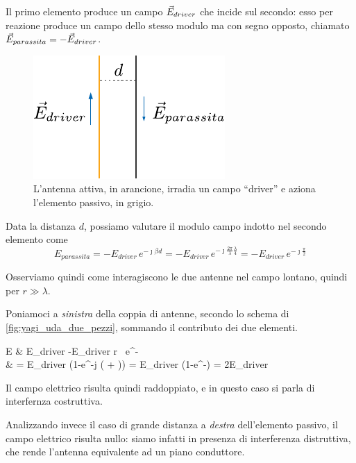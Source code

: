 Il primo elemento produce un campo $\vec{E}_{driver}$ che incide sul secondo: esso per reazione produce un campo dello stesso modulo ma con segno opposto, chiamato $\vec{E}_{parassita} = -\vec{E}_{driver}$.

\begin{figure}[htp]
	\centering
	\includegraphics[]{img/yagi_uda_due_pezzi.pdf}
	\caption{L'antenna attiva, in arancione, irradia un campo ``driver'' e aziona l'elemento passivo, in grigio.}
	\label{fig:yagi_uda_due_pezzi}
\end{figure}

Data la distanza $d$, possiamo valutare il modulo campo indotto nel secondo elemento come
\begin{equation}
	E_{parassita}
	= -E_{driver} \,e^{-\jmath \beta d}
	= -E_{driver} \,e^{-\jmath \frac{2 \pi}{\lambda} \frac{\lambda}{4}}
	= -E_{driver} \, e^{-\jmath \frac{\pi}{2}}
\end{equation}

Osserviamo quindi come interagiscono le due antenne nel campo lontano, quindi per $r \gg \lambda$.

Poniamoci a \emph{sinistra} della coppia di antenne, secondo lo schema di \autoref{fig:yagi_uda_due_pezzi}, sommando il contributo dei due elementi.
\begin{esp}
	E
	& \propto E_{driver}
	-E_{driver}
	 {r}
	\, e^{-\jmath{}} \\
	& = E_{driver}  (1-e^{-j (\beta{} + )})
	= E_{driver} (1-e^{-\jmath\pi})
	= 2E_{driver}
\end{esp}

Il campo elettrico risulta quindi raddoppiato, e in questo caso si parla di interfernza costruttiva.

Analizzando invece il caso di grande distanza a \emph{destra} dell'elemento passivo, il campo elettrico risulta nullo: siamo infatti in presenza di interferenza distruttiva, che rende l'antenna equivalente ad un piano conduttore.

